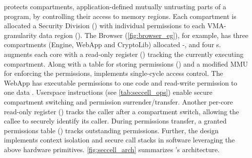 \seccells protects compartments, application-defined mutually untrusting
parts of a program, by controlling their access to memory regions.
Each compartment is allocated a Security Division (\secdiv)
with individual permissions to each VMA-granularity data region (\cell{}).
The Browser (\autoref{fig:browser_eg}), for example, has 
three compartments (Engine, WebApp and CryptoLib) allocated 
-, and four \cell{}s.
\seccells augments each core with a read-only register (\sid) tracking 
the currently executing compartment.
Along with a table for storing permissions (\ptable) and a modified
MMU for enforcing the permissions, \seccells implements single-cycle
access control.
The WebApp \secdiv has executable permissions
to one code \cell and read-write permission to one data \cell.
Userspace instructions (see \autoref{tab:seccell_ops}) enable 
secure compartment switching and permission surrender/transfer.
%
Another per-core read-only register (\rid) tracks the caller after a 
compartment switch, allowing the callee to securely identify 
its caller.
During permissions transfer, a granted permissions table (\gtable) tracks
outstanding permissions.
Further, the design implements context isolation and secure call stacks
in software leveraging the above hardware primitives.
\autoref{fig:seccell_arch} summarizes \seccells's architecture.


